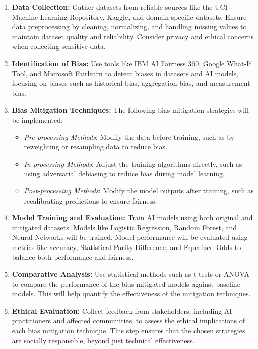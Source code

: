 \documentclass[a4paper, 12pt]{article}
\begin{document}
\begin{enumerate}
    \item \textbf{Data Collection:} Gather datasets from reliable sources like the UCI Machine Learning Repository, Kaggle, and domain-specific datasets. Ensure data preprocessing by cleaning, normalizing, and handling missing values to maintain dataset quality and reliability. Consider privacy and ethical concerns when collecting sensitive data.

    \item \textbf{Identification of Bias:} Use tools like IBM AI Fairness 360, Google What-If Tool, and Microsoft Fairlearn to detect biases in datasets and AI models, focusing on biases such as historical bias, aggregation bias, and measurement bias.

    \item \textbf{Bias Mitigation Techniques:} The following bias mitigation strategies will be implemented:
    \begin{itemize}
        \item \textit{Pre-processing Methods}: Modify the data before training, such as by reweighting or resampling data to reduce bias.
        \item \textit{In-processing Methods}: Adjust the training algorithms directly, such as using adversarial debiasing to reduce bias during model learning.
        \item \textit{Post-processing Methods}: Modify the model outputs after training, such as recalibrating predictions to ensure fairness.
    \end{itemize}
    
    \item \textbf{Model Training and Evaluation:} Train AI models using both original and mitigated datasets. Models like Logistic Regression, Random Forest, and Neural Networks will be trained. Model performance will be evaluated using metrics like accuracy, Statistical Parity Difference, and Equalized Odds to balance both performance and fairness.

    \item \textbf{Comparative Analysis:} Use statistical methods such as t-tests or ANOVA to compare the performance of the bias-mitigated models against baseline models. This will help quantify the effectiveness of the mitigation techniques.

    \item \textbf{Ethical Evaluation:} Collect feedback from stakeholders, including AI practitioners and affected communities, to assess the ethical implications of each bias mitigation technique. This step ensures that the chosen strategies are socially responsible, beyond just technical effectiveness.
\end{enumerate} 
\end{document}
